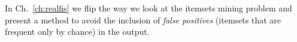 In Ch.~\ref{ch:realfis} we flip the way we look at the itemsets mining problem
and present a method to avoid the inclusion of \emph{false positives} (itemsets
that are frequent only by chance) in the output.


